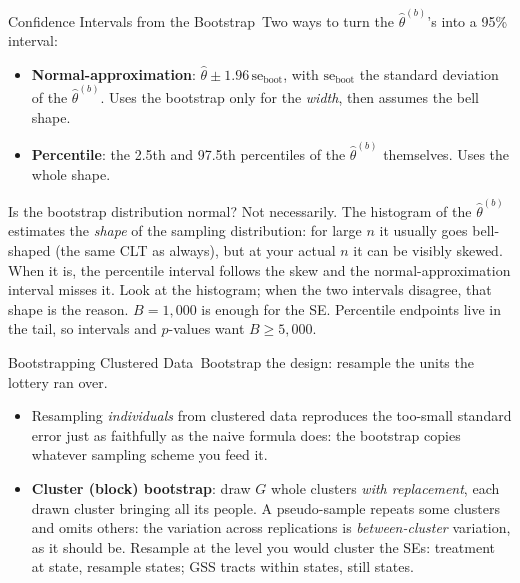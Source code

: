 \documentclass[aspectratio=169,11pt,xcolor=dvipsnames]{beamer}
\newcommand{\SE}{\mathrm{se}}
\newcommand{\core}{\,\raisebox{0.6pt}{\textcolor{corestar}{$\bigstar$}}}
\begin{document}
\begin{frame}{Confidence Intervals from the Bootstrap\core}
Two ways to turn the $\hat\theta^{(b)}$'s into a 95\% interval:
\begin{itemize}\itemsep3pt
  \item \textbf{Normal-approximation}:
        $\hat\theta \pm 1.96\,\SE_{\text{boot}}$, with $\SE_{\text{boot}}$
        the standard deviation of the $\hat\theta^{(b)}$. Uses the bootstrap
        only for the \emph{width}, then assumes the bell shape.
  \item \textbf{Percentile}: the 2.5th and 97.5th percentiles of the
        $\hat\theta^{(b)}$ themselves. Uses the whole shape.
\end{itemize}
\vskip3pt
Is the bootstrap distribution normal? \alert{Not necessarily.} The histogram of the $\hat\theta^{(b)}$ estimates the
\emph{shape} of the sampling distribution: for large $n$ it usually goes
bell-shaped (the same CLT as always), but at your actual $n$ it can be
visibly skewed. When it is, the percentile interval follows the skew and
the normal-approximation interval misses it. \alert{Look at the histogram;
when the two intervals disagree, that shape is the reason.}
\vskip2pt
{\footnotesize $B = 1{,}000$ is enough for the SE. Percentile endpoints live in the tail,
so intervals and $p$-values want $B \geq 5{,}000$.}
\end{frame}

\begin{frame}{Bootstrapping Clustered Data\core}
\alert{Bootstrap the design: resample the units the lottery ran over.}
\begin{itemize}\itemsep4pt
  \item Resampling \emph{individuals} from clustered data reproduces the
        too-small standard error just as faithfully as the naive formula
        does: the bootstrap copies whatever sampling scheme you feed it.
  \item \textbf{Cluster (block) bootstrap}: draw $G$ whole clusters
        \emph{with replacement}, each drawn cluster bringing all its people.
        A pseudo-sample repeats some clusters and omits others: the
        variation across replications is \emph{between-cluster} variation,
        as it should be. Resample at the level
        you would cluster the SEs: treatment at state, resample states;
        GSS tracts within states, still states.
\end{itemize}
\end{frame}
\end{document}
